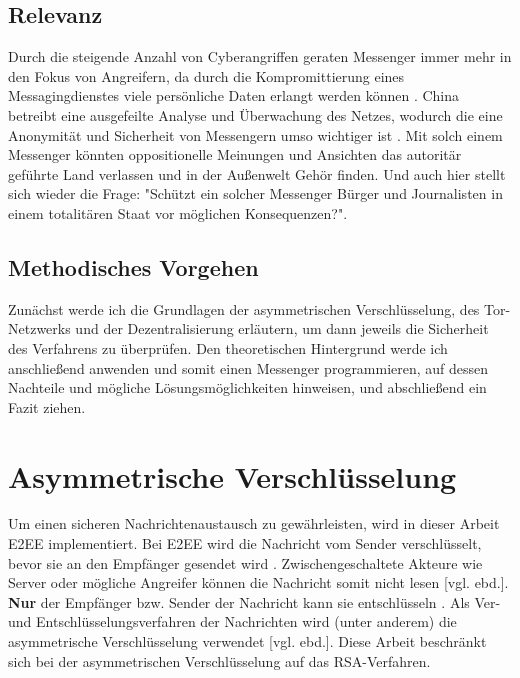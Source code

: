 \documentclass[a4paper,ngerman, headheight=28pt,12pt]{scrartcl}
\newcommand{\vcite}[1]{\cite[vgl.][]{#1}}
\newcommand{\vebd}{[vgl. ebd.]}
\begin{document}
\subsection{Relevanz}
Durch die steigende Anzahl von Cyberangriffen geraten  Messenger immer mehr in den Fokus von Angreifern, da durch die Kompromittierung eines Messagingdienstes viele persönliche Daten erlangt werden können \vcite{Cyberattacks}. China betreibt eine ausgefeilte Analyse und Überwachung des Netzes, wodurch die eine Anonymität und Sicherheit von Messengern umso wichtiger ist \vcite{GreatFirewallChina}. Mit solch einem Messenger könnten oppositionelle Meinungen und Ansichten das autoritär geführte Land verlassen und in der Außenwelt Gehör finden. Und auch hier stellt sich wieder die Frage: "Schützt ein solcher Messenger Bürger und Journalisten in einem totalitären Staat vor möglichen Konsequenzen?".

\subsection{Methodisches Vorgehen}
Zunächst werde ich die Grundlagen der asymmetrischen Verschlüsselung, des Tor-Netzwerks und der Dezentralisierung erläutern, um dann jeweils die Sicherheit des Verfahrens zu überprüfen. Den theoretischen Hintergrund werde ich anschließend anwenden und somit einen Messenger programmieren, auf dessen Nachteile und mögliche Lösungsmöglichkeiten hinweisen, und abschließend ein Fazit ziehen.

\section{Asymmetrische Verschlüsselung}
Um einen sicheren Nachrichtenaustausch zu gewährleisten, wird in dieser Arbeit E2EE implementiert. Bei E2EE wird die Nachricht vom Sender verschlüsselt, bevor sie an den Empfänger gesendet wird \vcite{E2EE}. Zwischengeschaltete Akteure wie Server oder mögliche Angreifer können die Nachricht somit nicht lesen \vebd. \textbf{Nur} der Empfänger bzw. Sender der Nachricht kann sie entschlüsseln \vcite{E2EE-Method}. Als Ver- und Entschlüsselungsverfahren der Nachrichten wird (unter anderem) die asymmetrische Verschlüsselung verwendet \vebd. Diese Arbeit beschränkt sich bei der asymmetrischen Verschlüsselung auf das RSA-Verfahren.
\end{document}
